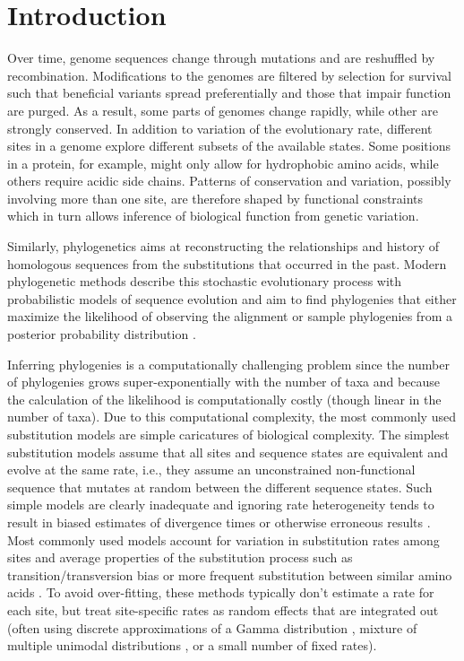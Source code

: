 \documentclass[aps,rmp,twocolumn,linenumbers]{revtex4-1}
\begin{document}
\section*{Introduction}
Over time, genome sequences change through mutations and are reshuffled by recombination.
Modifications to the genomes are filtered by selection for survival such that beneficial variants spread preferentially and those that impair function are purged.
As a result, some parts of genomes change rapidly, while other are strongly conserved.
In addition to variation of the evolutionary rate, different sites in a genome explore different subsets of the available states.
Some positions in a protein, for example, might only allow for hydrophobic amino acids, while others require acidic side chains.
Patterns of conservation and variation, possibly involving more than one site, are therefore shaped by functional constraints which in turn allows inference of biological function from genetic variation.

Similarly, phylogenetics aims at reconstructing the relationships and history of homologous sequences from the substitutions that occurred in the past.
Modern phylogenetic methods describe this stochastic evolutionary process with probabilistic models of sequence evolution and aim to find phylogenies that either maximize the likelihood of observing the alignment or sample phylogenies from a posterior probability distribution \citep{felsenstein2004inferring}.

Inferring phylogenies is a computationally challenging problem since the number of phylogenies grows super-exponentially with the number of taxa and because the calculation of the likelihood is computationally costly (though linear in the number of taxa).
Due to this computational complexity, the most commonly used substitution models are simple caricatures of biological complexity.
The simplest substitution models assume that all sites and sequence states are equivalent and evolve at the same rate, i.e., they assume an unconstrained non-functional sequence that mutates at random between the different sequence states.
Such simple models are clearly inadequate and ignoring rate heterogeneity tends to result in biased estimates of divergence times or otherwise erroneous results \citep{yang1996among}.
Most commonly used models account for variation in substitution rates among sites and average properties of the substitution process such as transition/transversion bias or more frequent substitution between similar amino acids \citep{yang_maximum_1994,FastTree2,nguyen_iq-tree:_2015,stamatakis_raxml_2014}.
To avoid over-fitting, these methods typically don't estimate a rate for each site, but treat site-specific rates as random effects that are integrated out (often using discrete approximations of a Gamma distribution \citep{yang1996among}, mixture of multiple unimodal distributions \citep{mayrose2005gamma}, or a small number of fixed rates).
\end{document}

